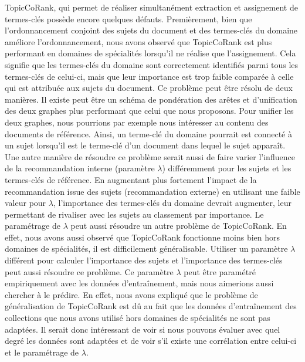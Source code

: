     TopicCoRank, qui permet de réaliser simultanément extraction et assignement
    de termes-clés possède encore quelques défauts. Premièrement, bien que
    l'ordonnancement conjoint des sujets du document et des termes-clés du
    domaine améliore l'ordonnancement, nous avons observé que TopicCoRank est
    plus performant en domaines de spécialités lorsqu'il ne réalise que
    l'assignement. Cela signifie que les termes-clés du domaine sont
    correctement identifiés parmi tous les termes-clés de celui-ci, mais que
    leur importance est trop faible comparée à celle qui est attribuée aux
    sujets du document. Ce problème peut être résolu de deux manières. Il existe
    peut être un schéma de pondération des arêtes et d'unification des deux
    graphes plus performant que celui que nous proposons. Pour unifier les deux
    graphes, nous pourrions par exemple nous intéresser au contenu des documents
    de référence. Ainsi, un terme-clé du domaine pourrait est connecté à un
    sujet lorsqu'il est le terme-clé d'un document dans lequel le sujet
    apparaît. Une autre manière de résoudre ce problème serait aussi de faire
    varier l'influence de la recommandation interne (paramètre $\lambda$)
    différemment pour les sujets et les termes-clés de référence. En augmentant
    plus fortement l'impact de la recommandation issue des sujets
    (recommandation externe) en utilisant une faible valeur pour $\lambda$,
    l'importance des termes-clés du domaine devrait augmenter, leur permettant
    de rivaliser avec les sujets au classement par importance. Le paramétrage de
    $\lambda$ peut aussi résoudre un autre problème de TopicCoRank. En effet,
    nous avons aussi observé que TopicCoRank fonctionne moins bien hors domaines
    de spécialités, il est difficilement généralisable. Utiliser un paramètre
    $\lambda$ différent pour calculer l'importance des sujets et l'importance
    des termes-clés peut aussi résoudre ce problème. Ce paramètre $\lambda$ peut
    être paramétré empiriquement avec les données d'entraînement, mais nous
    aimerions aussi chercher à le prédire. En effet, nous avons expliqué que le
    problème de généralisation de TopicCoRank est dû au fait que les données
    d'entraînement des collections que nous avons utilisé hors domaines de
    spécialités ne sont pas adaptées. Il serait donc intéressant de voir si nous
    pouvons évaluer avec quel degré les données sont adaptées et de voir s'il
    existe une corrélation entre celui-ci et le paramétrage de $\lambda$.

